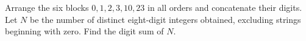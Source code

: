 Arrange the six blocks $0,1,2,3,10,23$ in all orders and concatenate their digits. Let $N$ be the number of distinct eight-digit integers obtained, excluding strings beginning with zero. Find the digit sum of $N$.
